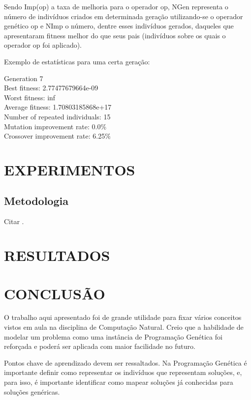 \documentclass[12pt]{article}
\begin{document}
Sendo Imp(op) a taxa de melhoria para o operador op, NGen representa o número de indivíduos
criados em determinada geração utilizando-se o operador genético op e NImp o número, dentre
esses indivíduos gerados, daqueles que apresentaram fitness melhor do que seus pais (indivíduos
sobre os quais o operador op foi aplicado).

Exemplo de estatísticas para uma certa geração:

\begin{center}
  Generation 7\\
  Best fitness: 2.77477679664e-09\\
  Worst fitness: inf\\
  Average fitness: 1.70803185868e+17\\
  Number of repeated individuals: 15\\
  Mutation improvement rate: 0.0\% \\
  Crossover improvement rate: 6.25\%
\end{center}

\section{EXPERIMENTOS}


\subsection{Metodologia}

Citar \cite{clalg:11}.

\section{RESULTADOS}



\section{CONCLUSÃO}

O trabalho aqui apresentado foi de grande utilidade para fixar vários conceitos vistos em aula
na disciplina de Computação Natural. Creio que a habilidade de modelar um problema como uma
instância de Programação Genética foi reforçada e poderá ser aplicada com maior facilidade
no futuro.

Pontos chave de aprendizado devem ser ressaltados. Na Programação Genética é importante
definir como representar os indivíduos que representam soluções, e, para isso, é importante
identificar como mapear soluções já conhecidas para soluções genéricas.
\end{document}
